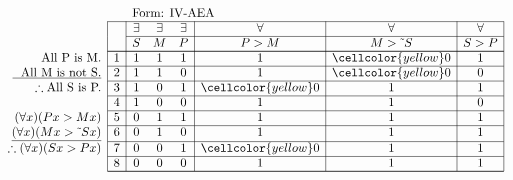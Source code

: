 \documentclass[10pt,legalpaper,landscape,cmtt]{article}
\begin{document}
{\begin{minipage}[t]{3.25in}
	\(
	\begin{array}{r|c|ccc|c|c|c|}
		\multicolumn{2}{c}{}&\multicolumn{6}{l}{\mbox{Form: IV-AEA}} \\ \cline{2-8}
		\hspace{1in}	&	& \exists & \exists & \exists & \forall & \forall & \forall\\ \cline{3-8}
		&	& S & M & P &  P > M  &  M > \tilde~S  &  S > P \\ \cline{2-8} \cline{2-8}
		\phantom{\therefore}\mbox{All P is M.}   & 1 & 1 & 1 & 1 &   1   &   \cellcolor{yellow} 0   &   1  \\ \cline{2-8}
		\underline{\phantom{\therefore}\mbox{All M is not S.}}   & 2 & 1 & 1 & 0 &   1   &   \cellcolor{yellow} 0   &   0  \\ \cline{2-8}
		\therefore \mbox{All S is P.}   & 3 & 1 & 0 & 1 &   \cellcolor{yellow} 0   &   1   &   1  \\ \cline{2-8}
		& 4 & 1 & 0 & 0 &   1   &   1   &   0  \\ \cline{2-8}
		(\forall x)(Px > Mx)   & 5 & 0 & 1 & 1 &   1   &   1   &   1  \\ \cline{2-8}
		\underline{(\forall x)(Mx > \tilde~Sx)}   & 6 & 0 & 1 & 0 &   1   &   1   &   1  \\ \cline{2-8}
		\therefore(\forall x)(Sx > Px)   & 7 & 0 & 0 & 1 &   \cellcolor{yellow} 0   &   1   &   1  \\ \cline{2-8}
		& 8 & 0 & 0 & 0 &   1   &   1   &   1   \\ \cline{2-8}\cline{2-8} 
	\end{array}
	\)
\end{minipage}

}
\end{document}
